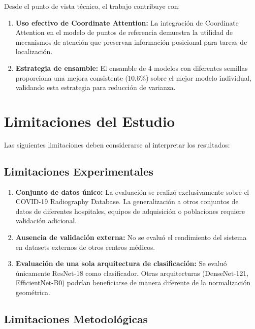 Desde el punto de vista técnico, el trabajo contribuye con:

\begin{enumerate}
    \item \textbf{Uso efectivo de Coordinate Attention:} La integración de Coordinate Attention en el modelo de puntos de referencia demuestra la utilidad de mecanismos de atención que preservan información posicional para tareas de localización.

    \item \textbf{Estrategia de ensamble:} El ensamble de 4 modelos con diferentes semillas proporciona una mejora consistente (10.6\%) sobre el mejor modelo individual, validando esta estrategia para reducción de varianza.
\end{enumerate}

\section{Limitaciones del Estudio}
\label{sec:limitaciones}

Las siguientes limitaciones deben considerarse al interpretar los resultados:

\subsection{Limitaciones Experimentales}
\label{subsec:limitaciones_experimentales}

\begin{enumerate}
    \item \textbf{Conjunto de datos único:} La evaluación se realizó exclusivamente sobre el COVID-19 Radiography Database. La generalización a otros conjuntos de datos de diferentes hospitales, equipos de adquisición o poblaciones requiere validación adicional.

    \item \textbf{Ausencia de validación externa:} No se evaluó el rendimiento del sistema en datasets externos de otros centros médicos.

    \item \textbf{Evaluación de una sola arquitectura de clasificación:} Se evaluó únicamente ResNet-18 como clasificador. Otras arquitecturas (DenseNet-121, EfficientNet-B0) podrían beneficiarse de manera diferente de la normalización geométrica.
\end{enumerate}

\subsection{Limitaciones Metodológicas}
\label{subsec:limitaciones_metodologicas}

